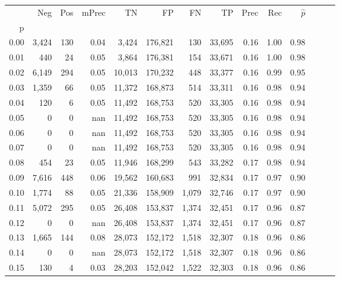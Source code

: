 \begin{tabular}{rrrrrrrrrrrrrr}
\toprule
{} &     Neg &    Pos & mPrec &       TN &       FP &      FN &      TP &  Prec &   Rec & $\hat{p}$ \\
p    &         &        &       &          &          &         &         &       &       &           \\
\midrule
0.00 &   3,424 &    130 &  0.04 &    3,424 &  176,821 &     130 &  33,695 &  0.16 &  1.00 &      0.98 \\
0.01 &     440 &     24 &  0.05 &    3,864 &  176,381 &     154 &  33,671 &  0.16 &  1.00 &      0.98 \\
0.02 &   6,149 &    294 &  0.05 &   10,013 &  170,232 &     448 &  33,377 &  0.16 &  0.99 &      0.95 \\
0.03 &   1,359 &     66 &  0.05 &   11,372 &  168,873 &     514 &  33,311 &  0.16 &  0.98 &      0.94 \\
0.04 &     120 &      6 &  0.05 &   11,492 &  168,753 &     520 &  33,305 &  0.16 &  0.98 &      0.94 \\
0.05 &       0 &      0 &   nan &   11,492 &  168,753 &     520 &  33,305 &  0.16 &  0.98 &      0.94 \\
0.06 &       0 &      0 &   nan &   11,492 &  168,753 &     520 &  33,305 &  0.16 &  0.98 &      0.94 \\
0.07 &       0 &      0 &   nan &   11,492 &  168,753 &     520 &  33,305 &  0.16 &  0.98 &      0.94 \\
0.08 &     454 &     23 &  0.05 &   11,946 &  168,299 &     543 &  33,282 &  0.17 &  0.98 &      0.94 \\
0.09 &   7,616 &    448 &  0.06 &   19,562 &  160,683 &     991 &  32,834 &  0.17 &  0.97 &      0.90 \\
0.10 &   1,774 &     88 &  0.05 &   21,336 &  158,909 &   1,079 &  32,746 &  0.17 &  0.97 &      0.90 \\
0.11 &   5,072 &    295 &  0.05 &   26,408 &  153,837 &   1,374 &  32,451 &  0.17 &  0.96 &      0.87 \\
0.12 &       0 &      0 &   nan &   26,408 &  153,837 &   1,374 &  32,451 &  0.17 &  0.96 &      0.87 \\
0.13 &   1,665 &    144 &  0.08 &   28,073 &  152,172 &   1,518 &  32,307 &  0.18 &  0.96 &      0.86 \\
0.14 &       0 &      0 &   nan &   28,073 &  152,172 &   1,518 &  32,307 &  0.18 &  0.96 &      0.86 \\
0.15 &     130 &      4 &  0.03 &   28,203 &  152,042 &   1,522 &  32,303 &  0.18 &  0.96 &      0.86 \\

\end{tabular}
